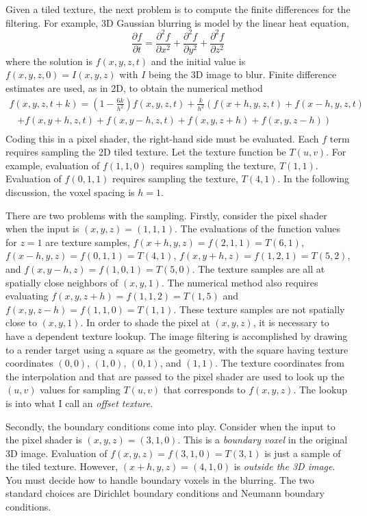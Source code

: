 \documentclass{article}
\begin{document}
Given a tiled texture, the next problem is to compute the finite differences
for the filtering.  For example, 3D Gaussian blurring is model by the linear
heat equation,
\[
  \frac{\partial f}{\partial t} =
    \frac{\partial^2 f}{\partial x^2} +
    \frac{\partial^2 f}{\partial y^2} +
    \frac{\partial^2 f}{\partial z^2}
\]
where the solution is $f(x,y,z,t)$ and the initial value is $f(x,y,z,0) =
I(x,y,z)$ with $I$ being the 3D image to blur.  Finite difference estimates
are used, as in 2D, to obtain the numerical method
\[
\begin{array}{l}
  f(x,y,z,t+k) =
    \left(1 - \frac{6k}{h^2} \right)f(x,y,z,t) +
    \frac{k}{h^2} \left( f(x+h,y,z,t) + f(x-h,y,z,t) \right. \\
    \;\;\; \left. + f(x,y+h,z,t) + f(x,y-h,z,t) + f(x,y,z+h) + f(x,y,z-h) \right) \\
\end{array}
\]
Coding this in a pixel shader, the right-hand side must be evaluated.  Each $f$
term requires sampling the 2D tiled texture.  Let the texture function be
$T(u,v)$.  For example, evaluation of $f(1,1,0)$ requires sampling the
texture, $T(1,1)$.  Evaluation of $f(0,1,1)$ requires sampling the texture,
$T(4,1)$.  In the following discussion, the voxel spacing is $h = 1$.

There are two problems with the sampling.  Firstly, consider the pixel shader
when the input is $(x,y,z) = (1,1,1)$.  The evaluations of the function values
for $z = 1$ are texture samples,
$f(x+h,y,z) = f(2,1,1) = T(6,1)$,
$f(x-h,y,z) = f(0,1,1) = T(4,1)$,
$f(x,y+h,z) = f(1,2,1) = T(5,2)$, and
$f(x,y-h,z) = f(1,0,1) = T(5,0)$.
The texture samples are all at spatially close neighbors of $(x,y,1)$.
The numerical method also requires evaluating
$f(x,y,z+h) = f(1,1,2) = T(1,5)$ and
$f(x,y,z-h) = f(1,1,0) = T(1,1)$.  These texture samples are not spatially
close to $(x,y,1)$.  In order to shade the pixel at $(x,y,z)$, it is necessary
to have a dependent texture lookup.  The image filtering is accomplished by
drawing to a render target using a square as the geometry, with the square
having texture coordinates $(0,0)$, $(1,0)$, $(0,1)$, and $(1,1)$.  The
texture coordinates from the interpolation and that are passed to the
pixel shader are used to look up the $(u,v)$ values for sampling $T(u,v)$
that corresponds to $f(x,y,z)$.  The lookup is into what I call an
{\em offset texture}.

Secondly, the boundary conditions come into play.  Consider when the input
to the pixel shader is $(x,y,z) = (3,1,0)$.  This is a {\em boundary voxel}
in the original 3D image.  Evaluation of $f(x,y,z) = f(3,1,0) = T(3,1)$ is
just a sample of the tiled texture.  However, $(x+h,y,z) = (4,1,0)$ is
{\em outside the 3D image}.  You must decide how to handle boundary voxels
in the blurring.  The two standard choices are Dirichlet boundary conditions
and Neumann boundary conditions.
\end{document}
